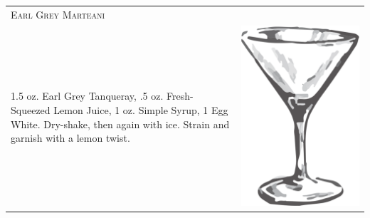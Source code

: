 \documentclass{article}
\begin{document}
\begin{tabular}{p{2in} p{0.5in}}
\multicolumn{2}{p{3in}}{\centering\Huge\textsc{Earl Grey Marteani}}\\ 
  \vspace{-0.1in}1.5 oz. Earl Grey Tanqueray, .5 oz. Fresh-Squeezed Lemon Juice, 1 oz. Simple Syrup, 1 Egg White. Dry-shake, then again with ice. Strain and garnish with a lemon twist. &
  \vspace{-0.1in} \includegraphics{goblet.png}
\end{tabular}
\end{document}
